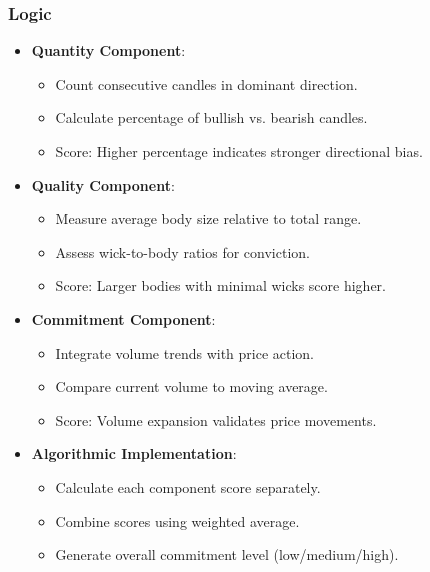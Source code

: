 \documentclass[12pt]{article}
\begin{document}
\subsubsection{Logic}
\begin{itemize}
\item \textbf{Quantity Component}:
  \begin{itemize}
  \item Count consecutive candles in dominant direction.
  \item Calculate percentage of bullish vs. bearish candles.
  \item Score: Higher percentage indicates stronger directional bias.
  \end{itemize}
\item \textbf{Quality Component}:
  \begin{itemize}
  \item Measure average body size relative to total range.
  \item Assess wick-to-body ratios for conviction.
  \item Score: Larger bodies with minimal wicks score higher.
  \end{itemize}
\item \textbf{Commitment Component}:
  \begin{itemize}
  \item Integrate volume trends with price action.
  \item Compare current volume to moving average.
  \item Score: Volume expansion validates price movements.
  \end{itemize}
\item \textbf{Algorithmic Implementation}:
  \begin{itemize}
  \item Calculate each component score separately.
  \item Combine scores using weighted average.
  \item Generate overall commitment level (low/medium/high).
  \end{itemize}
\end{itemize}
\end{document}
